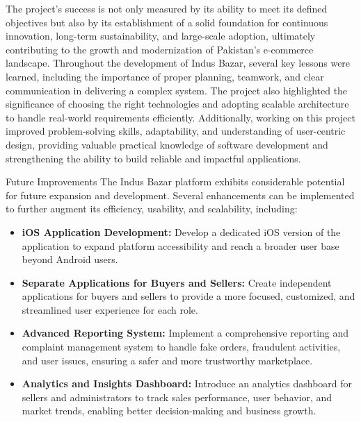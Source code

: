 The project's success is not only measured by its ability to meet its defined objectives but also by its establishment of a solid foundation for continuous innovation, long-term sustainability, and large-scale adoption, ultimately contributing to the growth and modernization of Pakistan's e-commerce landscape. Throughout the development of Indus Bazar, several key lessons were learned, including the importance of proper planning, teamwork, and clear communication in delivering a complex system. The project also highlighted the significance of choosing the right technologies and adopting scalable architecture to handle real-world requirements efficiently. Additionally, working on this project improved problem-solving skills, adaptability, and understanding of user-centric design, providing valuable practical knowledge of software development and strengthening the ability to build reliable and impactful applications.

Future Improvements 
The Indus Bazar platform exhibits considerable potential for future expansion and development. Several enhancements can be implemented to further augment its efficiency, usability, and scalability, including:

\begin{itemize}

\item \textbf{iOS Application Development:} Develop a dedicated iOS version of the application to expand platform accessibility and reach a broader user base beyond Android users.

\item \textbf{Separate Applications for Buyers and Sellers:} Create independent applications for buyers and sellers to provide a more focused, customized, and streamlined user experience for each role.

\item \textbf{Advanced Reporting System:} Implement a comprehensive reporting and complaint management system to handle fake orders, fraudulent activities, and user issues, ensuring a safer and more trustworthy marketplace.

\item \textbf{Analytics and Insights Dashboard:} Introduce an analytics dashboard for sellers and administrators to track sales performance, user behavior, and market trends, enabling better decision-making and business growth.

\end{itemize}




